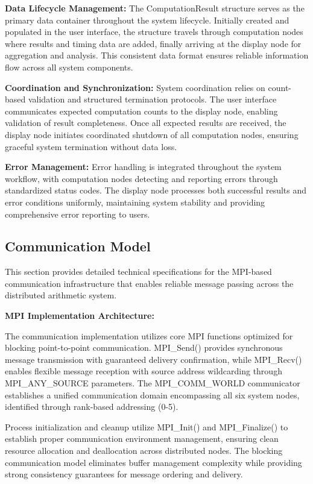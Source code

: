 \documentclass{article}
\begin{document}
\textbf{Data Lifecycle Management:}
The ComputationResult structure serves as the primary data container throughout the system lifecycle. Initially created and populated in the user interface, the structure travels through computation nodes where results and timing data are added, finally arriving at the display node for aggregation and analysis. This consistent data format ensures reliable information flow across all system components.

\textbf{Coordination and Synchronization:}
System coordination relies on count-based validation and structured termination protocols. The user interface communicates expected computation counts to the display node, enabling validation of result completeness. Once all expected results are received, the display node initiates coordinated shutdown of all computation nodes, ensuring graceful system termination without data loss.

\textbf{Error Management:}
Error handling is integrated throughout the system workflow, with computation nodes detecting and reporting errors through standardized status codes. The display node processes both successful results and error conditions uniformly, maintaining system stability and providing comprehensive error reporting to users.

\subsection{Communication Model}

This section provides detailed technical specifications for the MPI-based communication infrastructure that enables reliable message passing across the distributed arithmetic system.

\textbf{MPI Implementation Architecture:}

The communication implementation utilizes core MPI functions optimized for blocking point-to-point communication. MPI\_Send() provides synchronous message transmission with guaranteed delivery confirmation, while MPI\_Recv() enables flexible message reception with source address wildcarding through MPI\_ANY\_SOURCE parameters. The MPI\_COMM\_WORLD communicator establishes a unified communication domain encompassing all six system nodes, identified through rank-based addressing (0-5).

Process initialization and cleanup utilize MPI\_Init() and MPI\_Finalize() to establish proper communication environment management, ensuring clean resource allocation and deallocation across distributed nodes. The blocking communication model eliminates buffer management complexity while providing strong consistency guarantees for message ordering and delivery.
\end{document}
